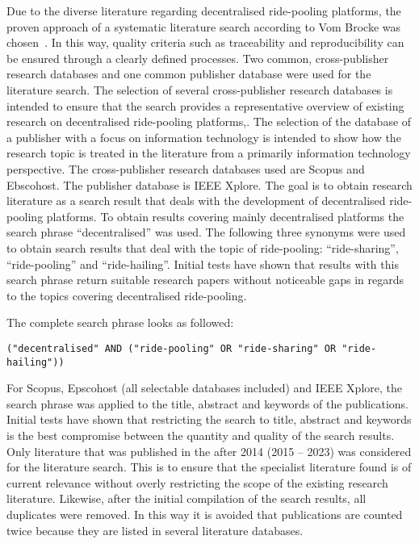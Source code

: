 Due to the diverse literature regarding decentralised ride-pooling platforms, the proven approach of a systematic literature search according to Vom Brocke was chosen~\cite{vomBrocke.2009}. In this way, quality criteria such as traceability and reproducibility can be ensured through a clearly defined processes. Two common, cross-publisher research databases and one common publisher database were used for the literature search.
The selection of several cross-publisher research databases is intended to ensure that the search provides a representative overview of existing research on decentralised ride-pooling platforms,. The selection of the database of a publisher with a focus on information technology is intended to show how the research topic is treated in the literature from a primarily information technology perspective. The cross-publisher research databases used are Scopus and Ebscohost. The publisher database is IEEE Xplore.
The goal is to obtain research literature as a search result that deals with the development of decentralised ride-pooling platforms. To obtain results covering mainly decentralised platforms the search phrase ``decentralised'' was used. The following three synonyms were used to obtain search results that deal with the topic of ride-pooling: ``ride-sharing'', ``ride-pooling'' and ``ride-hailing''. Initial tests have shown that results with this search phrase return suitable research papers without noticeable gaps in regards to the topics covering decentralised ride-pooling.

The complete search phrase looks as followed:
\begin{verbatim}
("decentralised" AND ("ride-pooling" OR "ride-sharing" OR "ride-hailing"))
\end{verbatim}

For Scopus, Epscohost (all selectable databases included) and IEEE Xplore, the search phrase was applied to the title, abstract and keywords of the publications. Initial tests have shown that restricting the search to title, abstract and keywords is the best compromise between the quantity and quality of the search results. Only literature that was published in the after 2014 (2015 – 2023) was considered for the literature search. This is to ensure that the specialist literature found is of current relevance without overly restricting the scope of the existing research literature. Likewise, after the initial compilation of the search results, all duplicates were removed. In this way it is avoided that publications are counted twice because they are listed in several literature databases.

